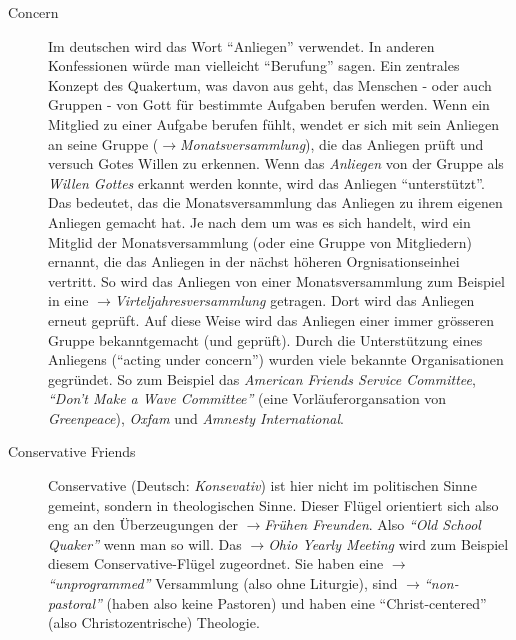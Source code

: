 \begin{description}
\item[Concern] Im deutschen wird das Wort ``Anliegen'' verwendet. In anderen
Konfessionen würde man vielleicht ``Berufung'' sagen. Ein zentrales Konzept des
Quakertum, was davon aus geht, das Menschen - oder auch Gruppen -  von Gott für
bestimmte Aufgaben berufen werden. Wenn ein Mitglied zu einer Aufgabe berufen
fühlt, wendet er sich mit sein Anliegen an seine Gruppe
($\to$\textit{Monatsversammlung}), die das Anliegen prüft und versuch Gotes
Willen zu erkennen. Wenn das \textit{Anliegen} von der Gruppe als \textit{Willen
Gottes} erkannt werden konnte, wird das Anliegen ``unterstützt''. Das bedeutet,
das die Monatsversammlung das Anliegen zu ihrem eigenen Anliegen gemacht hat. Je
nach dem um was es sich handelt, wird ein Mitglid der Monatsversammlung (oder
eine Gruppe von Mitgliedern) ernannt, die das Anliegen in der nächst höheren
Orgnisationseinhei vertritt. So wird das Anliegen von einer Monatsversammlung
zum Beispiel in eine $\to$\textit{Virteljahresversammlung} getragen. Dort wird
das Anliegen erneut geprüft. Auf diese Weise wird das Anliegen einer immer
grösseren Gruppe bekanntgemacht (und geprüft). Durch die Unterstützung eines
Anliegens ("`acting under concern"') wurden viele bekannte Organisationen
gegründet. So zum Beispiel das \textit{American Friends Service Committee},
\textit{``Don't Make a Wave Committee''} (eine Vorläuferorgansation von
\textit{Greenpeace}), \textit{Oxfam} und \textit{Amnesty International}.


 \item[Conservative Friends] Conservative (Deutsch: \textit{Konsevativ}) ist
hier nicht im politischen Sinne gemeint, sondern in theologischen Sinne. Dieser
Flügel orientiert sich also eng an den Überzeugungen der $\to$\textit{Frühen
Freunden}. Also \textit{"`Old School Quaker"'} wenn man so will. Das
$\to$\textit{Ohio Yearly Meeting} wird zum Beispiel diesem
Conservative-Flügel zugeordnet. Sie haben eine $\to$\textit{"`unprogrammed"'}
Versammlung (also ohne Liturgie), sind $\to$\textit{"`non-pastoral"'} (haben
also keine Pastoren) und haben eine "`Christ-centered"' (also Christozentrische)
Theologie.


\end{description}
